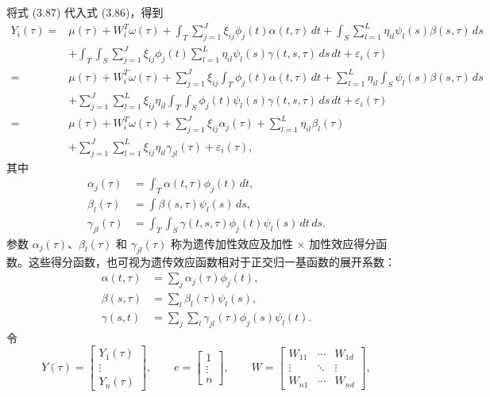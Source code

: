 将式 (3.87) 代入式 (3.86)，得到
\begingroup
\small
\begin{equation}
\begin{aligned}
Y_i(\tau)={}&\mu(\tau)+W_i^T\omega(\tau)
+\int_T\sum_{j=1}^{J}\xi_{ij}\phi_j(t)\alpha(t,\tau)\,dt
+\int_S\sum_{l=1}^{L}\eta_{il}\psi_l(s)\beta(s,\tau)\,ds\\
&+\int_T\int_S\sum_{j=1}^{J}\xi_{ij}\phi_j(t)
\sum_{l=1}^{L}\eta_{il}\psi_l(s)\gamma(t,s,\tau)\,ds\,dt
+\varepsilon_i(\tau)\\
={}&\mu(\tau)+W_i^T\omega(\tau)
+\sum_{j=1}^{J}\xi_{ij}\int_T\phi_j(t)\alpha(t,\tau)\,dt
+\sum_{l=1}^{L}\eta_{il}\int_S\psi_l(s)\beta(s,\tau)\,ds\\
&+\sum_{j=1}^{J}\sum_{l=1}^{L}\xi_{ij}\eta_{il}
\int_T\int_S\phi_j(t)\psi_l(s)\gamma(t,s,\tau)\,ds\,dt
+\varepsilon_i(\tau)\\
={}&\mu(\tau)+W_i^T\omega(\tau)
+\sum_{j=1}^{J}\xi_{ij}\alpha_j(\tau)+\sum_{l=1}^{L}\eta_{il}\beta_l(\tau)\\
&+\sum_{j=1}^{J}\sum_{l=1}^{L}\xi_{ij}\eta_{il}\gamma_{jl}(\tau)+\varepsilon_i(\tau),
\end{aligned}
\tag{3.89}
\end{equation}
\endgroup
其中
\[
\begin{aligned}
\alpha_j(\tau)&=\int_T\alpha(t,\tau)\phi_j(t)\,dt,\\
\beta_l(\tau)&=\int\beta(s,\tau)\psi_l(s)\,ds,\\
\gamma_{jl}(\tau)&=\int_T\int_S\gamma(t,s,\tau)\phi_j(t)\psi_l(s)\,dt\,ds.
\end{aligned}
\]
参数 $\alpha_j(\tau)$、$\beta_l(\tau)$ 和 $\gamma_{jl}(\tau)$ 称为遗传加性效应及加性 $\times$ 加性效应得分函数。这些得分函数，也可视为遗传效应函数相对于正交归一基函数的展开系数：
\[
\begin{aligned}
\alpha(t,\tau)&=\sum_j\alpha_j(\tau)\phi_j(t),\\
\beta(s,\tau)&=\sum_l\beta_l(\tau)\psi_l(s),\\
\gamma(s,t)&=\sum_j\sum_l\gamma_{jl}(\tau)\phi_j(s)\psi_l(t).
\end{aligned}
\]
令
\[
Y(\tau)=\begin{bmatrix}Y_1(\tau)\\\vdots\\Y_n(\tau)\end{bmatrix},\qquad
e=\begin{bmatrix}1\\\vdots\\n\end{bmatrix},\qquad
W=\begin{bmatrix}W_{11}&\cdots&W_{1d}\\\vdots&\ddots&\vdots\\W_{n1}&\cdots&W_{nd}\end{bmatrix},
\]
